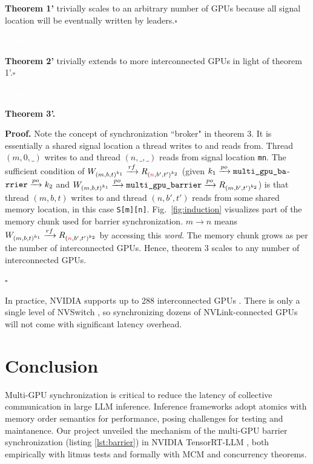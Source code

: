 \documentclass[acmsmall]{acmart}
\begin{document}
\noindent\textbf{Theorem 1'} trivially scales to an arbitrary number of GPUs because all signal location will be eventually written by leaders.\hfill $\square$

\textcolor{white}{delimiter}

\noindent\textbf{Theorem 2'} trivially extends to more interconnected GPUs in light of theorem 1'.\hfill $\square$

\textcolor{white}{delimiter}

\noindent\textbf{Theorem 3'.}

\noindent\textbf{Proof.} Note the concept of synchronization ``broker" in theorem 3. It is essentially a shared signal location a thread writes to and reads from. Thread $(m,0,\_)$ writes to and thread $(n,\_,\_)$ reads from signal location \verb|mn|. The sufficient condition of $W_{{(m,b,t)}^{k_1}} \xrightarrow[]{rf} R_{{(\textcolor{red}{n},b',t')}^{k_2}}$ (given $k_1 \xrightarrow[]{po} \verb|multi_gpu_ba|$-$\verb|rrier| \xrightarrow[]{po} k_2$ and $W_{{(m,b,t)}^{k_1}} \xrightarrow[]{po} \verb|multi_gpu_barrier| \xrightarrow[]{po} R_{{(m,b',t')}^{k_2}}$) is that thread $(m,b,t)$ writes to and thread $(n,b',t')$ reads from some shared memory location, in this case \verb|S[m][n]|. Fig.~\ref{fig:induction} visualizes part of the memory chunk used for barrier synchronization. $m \rightarrow n$ means $W_{{(m,b,t)}^{k_1}} \xrightarrow[]{rf} R_{{(\textcolor{red}{n},b',t')}^{k_2}}$ by accessing this \textit{word}. The memory chunk grows as per the number of interconnected GPUs. Hence, theorem 3 scales to any number of interconnected GPUs.

\begin{flushright}
$\square$
\end{flushright}

In practice, NVIDIA supports up to 288 interconnected GPUs \cite{nvl32,nvl36-72,computex}. There is only a single level of NVSwitch \cite{nvswitch}, so synchronizing dozens of NVLink-connected GPUs will not come with significant latency overhead.

\section{Conclusion}
\label{sec:conclusion}

Multi-GPU synchronization is critical to reduce the latency of collective communication in large
LLM inference. Inference frameworks adopt atomics with memory order semantics for performance, posing challenges for testing and maintanence. Our project unveiled the mechanism of the multi-GPU barrier synchronization (listing \ref{lst:barrier}) in NVIDIA TensorRT-LLM \cite{trt-llm}, both empirically with litmus tests and formally with MCM and concurrency theorems.
\end{document}
